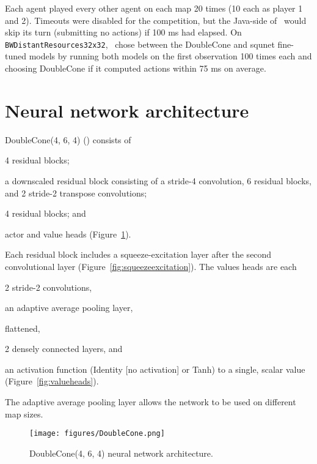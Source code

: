 \documentclass{article}
\begin{document}
Each agent played every other agent on each map 20 times (10 each as player 1 and 2).
Timeouts were disabled for the competition, but the Java-side of \agentName\ would skip
its turn (submitting no actions) if 100 ms had elapsed. On
\texttt{BWDistantResources32x32}, \agentName\ chose between the DoubleCone and squnet
fine-tuned models by running both models on the first observation 100 times each and
choosing DoubleCone if it computed actions within 75 ms on average.


\section{Neural network architecture}
DoubleCone(4, 6, 4) (\citep{Ferdinand2021doublecone}) consists of
\begin{inparaenum}[(1)]
    \item 4 residual blocks;
    \item a downscaled residual block consisting of a stride-4 convolution, 6 residual blocks, and
        2 stride-2 transpose convolutions;
    \item 4 residual blocks; and
    \item actor and value heads (Figure~\ref{fig:doublecone}).
\end{inparaenum}
Each residual block includes a squeeze-excitation layer after the second convolutional
layer (Figure~\ref{fig:squeezeexcitation}).  The values heads are each 
\begin{inparaenum}[(1)]
    \item 2 stride-2 convolutions,
    \item an adaptive average pooling layer,
    \item flattened,
    \item 2 densely connected layers, and
    \item an activation function (Identity [no activation] or Tanh) to a single, scalar value (Figure~\ref{fig:valueheads}).
\end{inparaenum}
The adaptive average pooling layer allows the network to be used on different map sizes.

\begin{figure}[H]
    \begin{center}
        \texttt{[image: figures/DoubleCone.png]}
    \end{center}
    \caption{DoubleCone(4, 6, 4) neural network architecture.}
    \label{fig:doublecone}
\end{figure}
\end{document}
